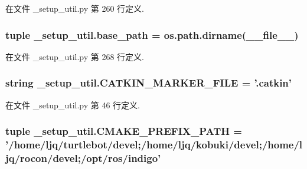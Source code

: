 在文件 \-\_\-setup\-\_\-util.\-py 第 260 行定义.

\hypertarget{namespace__setup__util_aecc545d18611814ee5d7ccdf6aa55f90}{
\subsubsection[{base\-\_\-path}]{\setlength{\rightskip}{0pt plus 5cm}tuple \-\_\-setup\-\_\-util.\-base\-\_\-path = os.\-path.\-dirname(\-\_\-\-\_\-file\-\_\-\-\_\-)}}\label{namespace__setup__util_aecc545d18611814ee5d7ccdf6aa55f90}


在文件 \-\_\-setup\-\_\-util.\-py 第 268 行定义.

\hypertarget{namespace__setup__util_a3fa0ca5a460a71a43cbc3d4954ab1f10}{
\subsubsection[{C\-A\-T\-K\-I\-N\-\_\-\-M\-A\-R\-K\-E\-R\-\_\-\-F\-I\-L\-E}]{\setlength{\rightskip}{0pt plus 5cm}string \-\_\-setup\-\_\-util.\-C\-A\-T\-K\-I\-N\-\_\-\-M\-A\-R\-K\-E\-R\-\_\-\-F\-I\-L\-E = '.catkin'}}\label{namespace__setup__util_a3fa0ca5a460a71a43cbc3d4954ab1f10}


在文件 \-\_\-setup\-\_\-util.\-py 第 46 行定义.

\hypertarget{namespace__setup__util_a44bed5f85daa4641b3c144edb9e8c1c1}{
\subsubsection[{C\-M\-A\-K\-E\-\_\-\-P\-R\-E\-F\-I\-X\-\_\-\-P\-A\-T\-H}]{\setlength{\rightskip}{0pt plus 5cm}tuple \-\_\-setup\-\_\-util.\-C\-M\-A\-K\-E\-\_\-\-P\-R\-E\-F\-I\-X\-\_\-\-P\-A\-T\-H = '/home/ljq/turtlebot/devel;/home/ljq/kobuki/devel;/home/ljq/rocon/devel;/opt/ros/indigo'}}\label{namespace__setup__util_a44bed5f85daa4641b3c144edb9e8c1c1}


